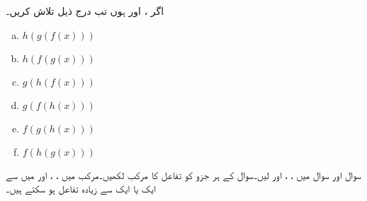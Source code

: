 اگر ،  اور  ہوں تب درج ذیل تلاش کریں۔
\begin{multicols}{4}
\begin{enumerate}[a.]
\item
$h(g(f(x)))$
\item
$h(f(g(x)))$
\item
$g(h(f(x)))$
\item
$g(f(h(x)))$
\item
$f(g(h(x)))$
\item
$f(h(g(x)))$
\end{enumerate}
\end{multicols}
سوال  اور سوال  میں ، ،  اور  لیں۔سوال کے ہر جزو کو تفاعل کا مرکب لکھیں۔مرکب میں ، ،  اور  میں سے ایک یا ایک سے زیادہ تفاعل ہو سکتے ہیں۔

